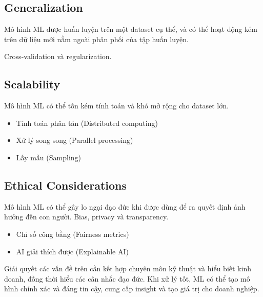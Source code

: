 \subsection{Generalization}

\begin{dinhnghia}[title={Generalization}]
Mô hình ML được huấn luyện trên một dataset cụ thể, và có thể hoạt động kém trên dữ liệu mới nằm ngoài phân phối của tập huấn luyện.
\end{dinhnghia}

\begin{phuongphap}[title={Cách xử lý}]
Cross-validation và regularization.
\end{phuongphap}

\subsection{Scalability}

\begin{dinhnghia}[title={Scalability}]
Mô hình ML có thể tốn kém tính toán và khó mở rộng cho dataset lớn.
\end{dinhnghia}

\begin{phuongphap}[title={Một số cách xử lý}]
\begin{itemize}
  \item Tính toán phân tán (Distributed computing)
  \item Xử lý song song (Parallel processing)
  \item Lấy mẫu (Sampling)
\end{itemize}
\end{phuongphap}

\subsection{Ethical Considerations}

\begin{dongco}[title={Vấn đề đạo đức}]
Mô hình ML có thể gây lo ngại đạo đức khi được dùng để ra quyết định ảnh hưởng đến con người.
Bias, privacy và transparency.
\end{dongco}

\begin{phuongphap}[title={Một số kỹ thuật hỗ trợ}]
\begin{itemize}
  \item Chỉ số công bằng (Fairness metrics)
  \item AI giải thích được (Explainable AI)
\end{itemize}
\end{phuongphap}

\begin{luuy}[title={Kết luận}]
Giải quyết các vấn đề trên cần kết hợp chuyên môn kỹ thuật và hiểu biết kinh doanh, đồng thời hiểu các cân nhắc đạo đức.
Khi xử lý tốt, ML có thể tạo mô hình chính xác và đáng tin cậy, cung cấp insight và tạo giá trị cho doanh nghiệp.
\end{luuy}
